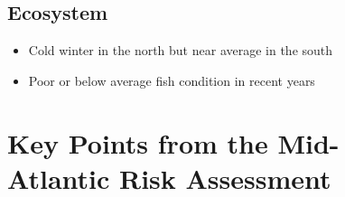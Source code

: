\documentclass[
  10pt,
  letterpaper,
  DIV=11,
  numbers=noendperiod]{scrartcl}
\providecommand{\tightlist}{%
  \setlength{\itemsep}{0pt}\setlength{\parskip}{0pt}}\usepackage{longtable,booktabs,array}
\begin{document}
\begin{figure}
\begin{minipage}[t]{0.03\linewidth}
{}

\end{minipage}%
%
\begin{minipage}[t]{0.40\linewidth}

{\centering 

\subsection{Ecosystem}

}

\end{minipage}%
\newline
\begin{minipage}[t]{0.57\linewidth}

{\centering 

\begin{itemize}
\tightlist
\item
  Cold winter in the north but near average in the south
\item
  Poor or below average fish condition in recent years
\end{itemize}

}

\end{minipage}%
%
\begin{minipage}[t]{0.03\linewidth}

{\centering 

\vspace{0.5cm}
\section{Key Points from the Mid-Atlantic Risk Assessment}

}

\end{minipage}%
%
\begin{minipage}[t]{0.40\linewidth}

{\centering 

}

\end{minipage}%
\newline
\begin{minipage}[t]{0.57\linewidth}

{\centering 

\raggedright

}

\end{minipage}%
%
\begin{minipage}[t]{0.03\linewidth}


\end{minipage}
\end{figure}
\end{document}
